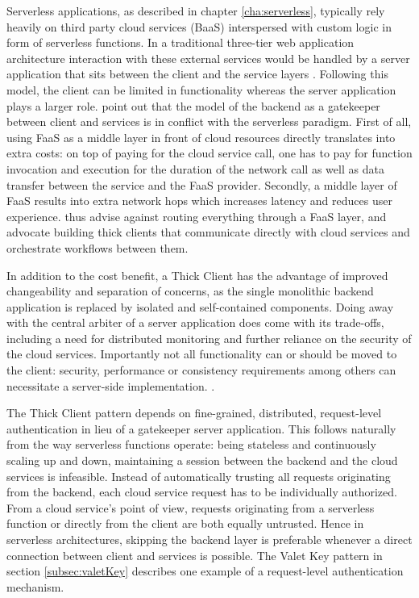 Serverless applications, as described in chapter \ref{cha:serverless}, typically rely heavily on third party cloud services (BaaS) interspersed with custom logic in form of serverless functions. In a traditional three-tier web application architecture interaction with these external services would be handled by a server application that sits between the client and the service layers \parencite{robert2016serverlessarchitectures}. Following this model, the client can be limited in functionality whereas the server application plays a larger role. \textcite{sbarski2017serverless} point out that the model of the backend as a gatekeeper between client and services is in conflict with the serverless paradigm. First of all, using FaaS as a middle layer in front of cloud resources directly translates into extra costs: on top of paying for the cloud service call, one has to pay for function invocation and execution for the duration of the network call as well as data transfer between the service and the FaaS provider. Secondly, a middle layer of FaaS results into extra network hops which increases latency and reduces user experience. \textcite{sbarski2017serverless} thus advise against routing everything through a FaaS layer, and advocate building thick clients that communicate directly with cloud services and orchestrate workflows between them.

In addition to the cost benefit, a Thick Client has the advantage of improved changeability and separation of concerns, as the single monolithic backend application is replaced by isolated and self-contained components. Doing away with the central arbiter of a server application does come with its trade-offs, including a need for distributed monitoring and further reliance on the security of the cloud services. Importantly not all functionality can or should be moved to the client: security, performance or consistency requirements among others can necessitate a server-side implementation. \parencite{robert2016serverlessarchitectures}.

The Thick Client pattern depends on fine-grained, distributed, request-level authentication in lieu of a gatekeeper server application. This follows naturally from the way serverless functions operate: being stateless and continuously scaling up and down, maintaining a session between the backend and the cloud services is infeasible. Instead of automatically trusting all requests originating from the backend, each cloud service request has to be individually authorized. From a cloud service's point of view, requests originating from a serverless function or directly from the client are both equally untrusted. Hence in serverless architectures, skipping the backend layer is preferable whenever a direct connection between client and services is possible. The Valet Key pattern in section \ref{subsec:valetKey} describes one example of a request-level authentication mechanism. \parencite{adzic2017serverless}

